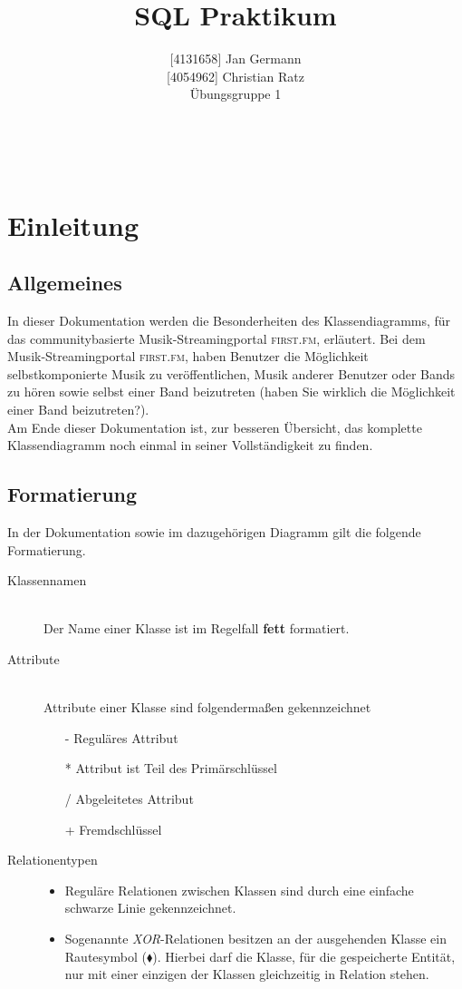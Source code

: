 \documentclass[11pt,a4paper,DIV=9]{scrartcl}
\author{{[}4131658{]} Jan Germann \\{[}4054962{]} Christian Ratz\\Übungsgruppe 1}
\title{SQL Praktikum}
\renewcommand{\author}[1]{\renewcommand{\author}{#1}}
\renewcommand{\title}[1]{\renewcommand{\title}{#1}}
\newcommand{\makehomeworktitle}{
  \begin{minipage}[t]{6.5cm}
    \sf{\author}
  \end{minipage}
  \begin{minipage}[t]{6.5cm}
    \begin{flushright}
      \sf{\title\\\today}
    \end{flushright}
  \end{minipage}
  \\[0.2cm]
  \begin{center}
    \sf{
      \color{blue}{
        \LARGE{Dokumentation First.FM}
      }
    }
  \end{center}
  \vspace{0.1cm}
}
\begin{document}
\makehomeworktitle
\tableofcontents
\newpage
\section{Einleitung}
  \subsection{Allgemeines}
    In dieser Dokumentation werden die Besonderheiten des Klassendiagramms, für das communitybasierte Musik-Streamingportal \textsc{first.fm}, erläutert. Bei dem Musik-Streamingportal \textsc{first.fm}, haben Benutzer die Möglichkeit selbstkomponierte Musik zu veröffentlichen, Musik anderer Benutzer oder Bands zu hören sowie selbst einer Band beizutreten (haben Sie wirklich die M\"oglichkeit einer Band beizutreten?).\\
    Am Ende dieser Dokumentation ist, zur besseren Übersicht, das komplette Klassendiagramm noch einmal in seiner Vollständigkeit zu finden.

  \subsection{Formatierung} 
    In der Dokumentation sowie im dazugehörigen Diagramm gilt die folgende Formatierung.

    \begin{description}
      \item [Klassennamen] \hfill \\
        Der Name einer Klasse ist im Regelfall \textbf{fett} formatiert.
      \item [Attribute] \hfill \\
        Attribute einer Klasse sind folgendermaßen gekennzeichnet
        \begin{itemize}
          \item[-] Reguläres Attribut
          \item[*] Attribut ist Teil des Primärschlüssel
          \item[/] Abgeleitetes Attribut
          \item[+] Fremdschlüssel
        \end{itemize}
      \item[Relationentypen] \hfill
      \begin{itemize}
        \item Reguläre Relationen zwischen Klassen sind durch eine einfache schwarze Linie gekennzeichnet.
        \item Sogenannte \textit{XOR}-Relationen besitzen an der ausgehenden Klasse ein Rautesymbol ($\blacklozenge$). Hierbei darf die Klasse, für die gespeicherte Entität, nur mit einer einzigen der Klassen gleichzeitig in Relation stehen.
      \end{itemize}
    \end{description}
\end{document}
